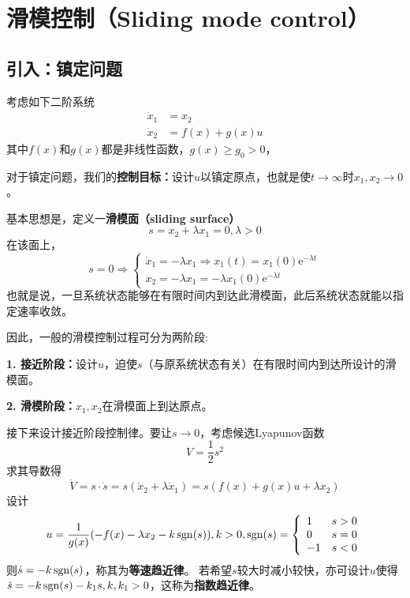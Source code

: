 \newpage
\section{滑模控制（Sliding mode control）}\label{5Cref}


\subsection{引入：镇定问题}

 考虑如下二阶系统
 \begin{equation}
   \begin{aligned}
    \dot{x}_1 & = x_2\\
    \dot{x}_2 & = f (x) + g (x) u
    \end{aligned}\label{Sys:sliding_mode}
 \end{equation}
  其中$f (x)$和$g (x)$都是非线性函数，$g (x) \geq g_0 > 0$，
  
  对于镇定问题，我们的\textbf{控制目标：}设计$u$以镇定原点，也就是使$t
  \rightarrow \infty $时$ x_1, x_2 \rightarrow 0$。
  
  基本思想是，定义一\textbf{滑模面（sliding surface）}\[s = x_2 + \lambda x_1 = 0,
  \lambda > 0\]
  在该面上， \[ s = 0 \Rightarrow \left\{\begin{array}{l}
       \dot{x}_1 = - \lambda x_1 \Rightarrow x_1 (t) = x_1 (0) \mathrm{e}^{- \lambda t}\\
       x_2 = - \lambda x_1 = - \lambda x_1 (0) \mathrm{e}^{- \lambda  t}
     \end{array}\right. \]
     也就是说，一旦系统状态能够在有限时间内到达此滑模面，此后系统状态就能以指定速率收敛。
  
  因此，一般的滑模控制过程可分为两阶段:
  
  \textbf{1. 接近阶段：}设计$u$，迫使$s$（与原系统状态有关）在有限时间内到达所设计的滑模面。
  
  \textbf{2. 滑模阶段：}$x_1, x_2$在滑模面上到达原点。
  
  接下来设计接近阶段控制律。要让$s\to 0$，考虑候选Lyapunov函数\[V = \frac{1}{2} s^2\]
  求其导数得
  \[ \dot{V} = s \cdot \dot{s}=s(\dot{x}_2 + \lambda \dot{x}_1) = s (f (x) + g (x) u + \lambda x_2) \]
  设计\[u = \frac{1}{g (x)} (- f (x) - \lambda x_2 - k \operatorname{sgn} (s)),k > 0,\operatorname{sgn}(s) = \left\{\begin{array}{ll}
  1 & s > 0\\
  0 & s = 0\\
  - 1 & s < 0
\end{array}\right.\]
  则$\dot{s} = - k \operatorname{sgn} (s)$，称其为\textbf{等速趋近律}。
  若希望$s$较大时减小较快，亦可设计$u$使得$\dot{s}
  = - k \operatorname{sgn} (s) - k_1 s,k,k_1>0$，这称为\textbf{指数趋近律}。
  
